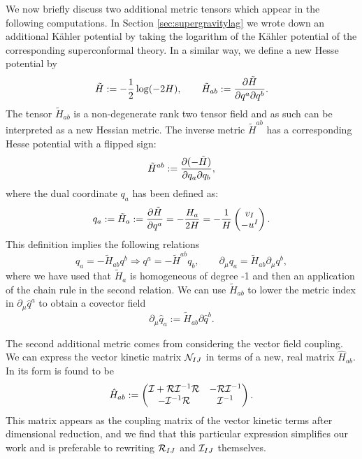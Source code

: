 We now briefly discuss two additional metric tensors which appear in the following computations. In Section \ref{sec:supergravitylag} we wrote down an additional K\"ahler potential by taking the logarithm of the K\"ahler potential of the corresponding superconformal theory. In a similar way, we define a new Hesse potential by
\begin{equation*}
	\tilde{H} := - \frac{1}{2} \log (-2H), \qquad \tilde{H}_{ab} := \frac{\partial \tilde{H}}{\partial q^a \partial q^b}.
\end{equation*}
The tensor $\tilde{H}_{ab}$ is a non-degenerate rank two tensor field and as such can be interpreted as a new Hessian metric. The inverse metric $\tilde{H}^{ab}$ has a corresponding Hesse potential with a flipped sign:
\begin{equation*}
	\tilde{H}^{ab} := \frac{\partial (-\tilde{H})}{\partial q_a \partial q_b},
\end{equation*}
where the dual coordinate $q_a$ has been defined as:
\begin{equation}
 q_a := \tilde{H}_a := \frac{\partial \tilde{H}}{\partial q^a} = -\frac{H_a}{2H}= - \frac{1}{H}\begin{pmatrix} v_I \\ -u^I \end{pmatrix}.
\end{equation}
This definition implies the following relations
\begin{equation}
 q_a = -\tilde{H}_{ab}q^b \Rightarrow q^a = - \tilde{H}^{ab}q_b, \qquad \partial_\mu q_a = \tilde{H}_{ab} \partial_\mu q^b,
\end{equation}
where we have used that $\tilde{H}_a$ is homogeneous of degree -1 and then an application of the chain rule in the second relation. We can use $\tilde{H}_{ab}$ to lower the metric index in $\partial_\mu \hat{q}^a$ to obtain a covector field
\begin{equation}
 \partial_\mu \hat{q}_a := \tilde{H}_{ab} \partial \hat{q}^b.
\end{equation}

The second additional metric comes from considering the vector field coupling. We can express the vector kinetic matrix ${\cal N}_{IJ}$ in terms of a new, real matrix $\hat{H}_{ab}$. In \cite{Cortes:2011aj} its form is found to be
\begin{equation}
\hat{H}_{ab} := \begin{pmatrix} {\cal I} + {\cal R}{\cal I}^{-1}{\cal R} & -{\cal R}{\cal I}^{-1} \\ -{\cal I}^{-1}{\cal R} & {\cal I}^{-1}\end{pmatrix}.
\end{equation}
This matrix appears as the coupling matrix of the vector kinetic terms after dimensional reduction, and we find that this particular expression simplifies our work and is preferable to rewriting ${\cal R}_{IJ}$ and ${\cal I}_{IJ}$ themselves.


